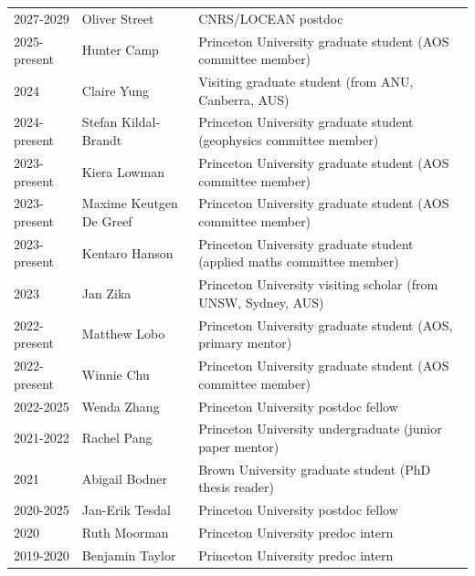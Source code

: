 \documentclass{article}
\begin{document}
\begin{tabular}{lll}

2027-2029 & Oliver Street& CNRS/LOCEAN postdoc \\

2025-present & Hunter Camp& Princeton University graduate student (AOS committee member) \\

2024 & Claire Yung & Visiting graduate student (from ANU, Canberra, AUS) \\

2024-present & Stefan Kildal-Brandt& Princeton University graduate student (geophysics committee member) \\

2023-present & Kiera Lowman& Princeton University graduate student (AOS committee member)  \\

2023-present & Maxime Keutgen De Greef& Princeton University graduate student (AOS committee member) \\

2023-present & Kentaro Hanson& Princeton University graduate student (applied maths committee member) \\

2023 & Jan Zika & Princeton University visiting scholar (from UNSW, Sydney, AUS) 
\\

2022-present & Matthew Lobo& Princeton University graduate student (AOS, primary mentor) \\

2022-present & Winnie Chu& Princeton University graduate student (AOS committee member)  \\

2022-2025 & Wenda Zhang& Princeton University postdoc fellow \\

2021-2022 & Rachel Pang& Princeton University undergraduate (junior paper mentor) \\ 

2021 & Abigail Bodner& Brown University graduate student (PhD thesis reader) \\ 

2020-2025 & Jan-Erik Tesdal& Princeton University postdoc fellow \\ 

2020 & Ruth Moorman & Princeton University predoc intern \\ 

2019-2020 & Benjamin Taylor & Princeton University predoc intern \\ 


\end{tabular}
\end{document}

